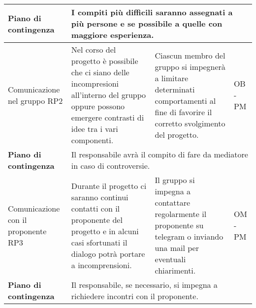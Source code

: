 \begin{center}
\begin{longtable}{|p{}|p{}|p{}|p{}|}
		\hline
		\centering \textbf{Piano di contingenza} & \multicolumn{3}{p{0.84\textwidth}}{I compiti più difficili saranno assegnati a più persone e se possibile a quelle con maggiore esperienza.} \\
		\hline
		\centering Comunicazione nel gruppo RP2& Nel corso del progetto è possibile che ci siano delle incompresioni all'interno del gruppo oppure possono emergere contrasti di idee tra i vari componenti. &Ciascun membro del gruppo si impegnerà a limitare determinati comportamenti al fine di favorire il corretto svolgimento del progetto. & OB - PM \\
		\hline
		\centering \textbf{Piano di contingenza} & \multicolumn{3}{p{0.84\textwidth}}{Il responsabile avrà il compito di fare da mediatore in caso di controversie.} \\
		\hline
		\centering Comunicazione con il proponente RP3& Durante il progetto ci saranno continui contatti con il proponente del progetto e in alcuni casi sfortunati il dialogo potrà portare a incomprensioni.& Il gruppo si impegna a contattare regolarmente il proponente su telegram o inviando una mail per eventuali chiarimenti. & OM - PM \\
		\hline
		\centering \textbf{Piano di contingenza} & \multicolumn{3}{p{0.84\textwidth}}{Il responsabile, se necessario, si impegna a richiedere incontri con il proponente.} \\
		\hline			
	\end{longtable}
\end{center}
